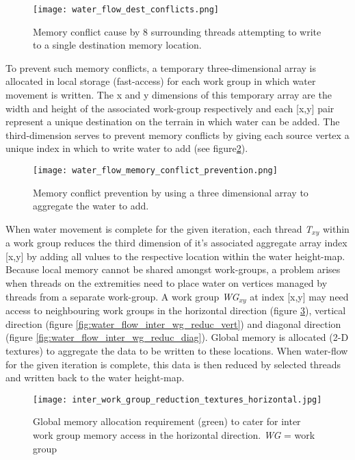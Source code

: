 \begin{figure}
\center
	\texttt{[image: water\_flow\_dest\_conflicts.png]}
	\caption{ Memory conflict cause by 8 surrounding threads attempting to write to a single destination memory location. }
	\label{fig:water_flow_dest_conflicts}
\end{figure}

To prevent such memory conflicts, a temporary three-dimensional array is allocated in local storage (fast-access) for each work group in which water movement is written. The x and y dimensions of this temporary array are the width and height of the associated work-group respectively and each [x,y] pair represent a unique destination on the terrain in which water can be added. The third-dimension serves to prevent memory conflicts by giving each source vertex a unique index in which to write water to add (see figure\ref{fig:water_flow_dest_conflict_prevent}).\\

\begin{figure}
\center
	\texttt{[image: water\_flow\_memory\_conflict\_prevention.png]}
	\caption{ Memory conflict prevention by using a three dimensional array to aggregate the water to add. }
	\label{fig:water_flow_dest_conflict_prevent}
\end{figure}

When water movement is complete for the given iteration, each thread \textit{T$_{xy}$} within a work group reduces the third dimension of it's associated aggregate array index [x,y] by adding all values to the respective location within the water height-map.\\

Because local memory cannot be shared amongst work-groups, a problem arises when threads on the extremities need to place water on vertices managed by threads from a separate work-group. A work group \textit{WG$_{xy}$} at index [x,y] may need access to neighbouring work groups in the horizontal direction (figure \ref{fig:water_flow_inter_wg_reduc_horiz}), vertical direction (figure \ref{fig:water_flow_inter_wg_reduc_vert}) and diagonal direction (figure \ref{fig:water_flow_inter_wg_reduc_diag}). Global memory is allocated (2-D textures) to aggregate the data to be written to these locations. When water-flow for the given iteration is complete, this data is then reduced by selected threads and written back to the water height-map.

\begin{figure}
\center
	\texttt{[image: inter\_work\_group\_reduction\_textures\_horizontal.jpg]}
	\caption{ Global memory allocation requirement (green) to cater for inter work group memory access in the horizontal direction. \textit{WG} = work group}
	\label{fig:water_flow_inter_wg_reduc_horiz}
\end{figure}

